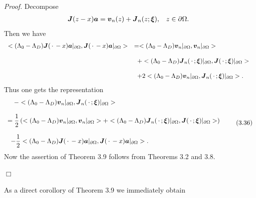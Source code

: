 {\it\noindent Proof.}
Decompose
$$\begin{array}{ll}
\displaystyle
\mbox{\boldmath $J$}(z-x)\mbox{\boldmath $a$}
=\mbox{\boldmath $v$}_n(z)+\mbox{\boldmath $J$}_n(z;\mbox{\boldmath $\xi$}),
&
\displaystyle
z\in\partial\Omega.
\end{array}
$$
Then we have
$$\begin{array}{ll}
\displaystyle
<(\Lambda_0-\Lambda_D)\mbox{\boldmath $J$}(\,\cdot\,-x)\mbox{\boldmath $a$}\vert_{\partial\Omega},
\mbox{\boldmath $J$}(\,\cdot\,-x)\mbox{\boldmath $a$}\vert_{\partial\Omega}>
&
\displaystyle
=<(\Lambda_0-\Lambda_D)\mbox{\boldmath $v$}_n\vert_{\partial\Omega},
\mbox{\boldmath $v$}_n\vert_{\partial\Omega}>\\
\\
\displaystyle
&
\displaystyle
\,\,\,
+<(\Lambda_0-\Lambda_D)\mbox{\boldmath $J$}_n(\,\cdot\,;\mbox{\boldmath $\xi$})\vert_{\partial\Omega},
\mbox{\boldmath $J$}(\,\cdot\,;\mbox{\boldmath $\xi$})\vert_{\partial\Omega}>\\
\\
\displaystyle
&
\displaystyle
\,\,\,
+2<(\Lambda_0-\Lambda_D)\mbox{\boldmath $v$}_n\vert_{\partial\Omega},
\mbox{\boldmath $J$}_n(\,\cdot\,;\mbox{\boldmath $\xi$})\vert_{\partial\Omega}>.
\end{array}
$$
Thus one gets the representation
$$\begin{array}{l}
\,\,\,\,\,\,
\displaystyle
-<(\Lambda_0-\Lambda_D)\mbox{\boldmath $v$}_n\vert_{\partial\Omega},
\mbox{\boldmath $J$}_n(\,\cdot\,;\mbox{\boldmath $\xi$})\vert_{\partial\Omega}>
\\
\\
\displaystyle
=\frac{1}{2}
\left(<(\Lambda_0-\Lambda_D)\mbox{\boldmath $v$}_n\vert_{\partial\Omega},
\mbox{\boldmath $v$}_n\vert_{\partial\Omega}>
+<(\Lambda_0-\Lambda_D)\mbox{\boldmath $J$}_n(\,\cdot\,;\mbox{\boldmath $\xi$})\vert_{\partial\Omega},
\mbox{\boldmath $J$}(\,\cdot\,;\mbox{\boldmath $\xi$})\vert_{\partial\Omega}>
\right)\\
\\
\displaystyle
\,\,\,
-\frac{1}{2}<(\Lambda_0-\Lambda_D)\mbox{\boldmath $J$}(\,\cdot\,-x)\mbox{\boldmath $a$}\vert_{\partial\Omega},
\mbox{\boldmath $J$}(\,\cdot\,-x)\mbox{\boldmath $a$}\vert_{\partial\Omega}>.
\end{array}
\tag {3.36}
$$
Now the assertion of Theorem 3.9 follows from Theorems 3.2 and 3.8.

\noindent
$\Box$


As a direct corollory of Theorem 3.9 we immediately obtain


